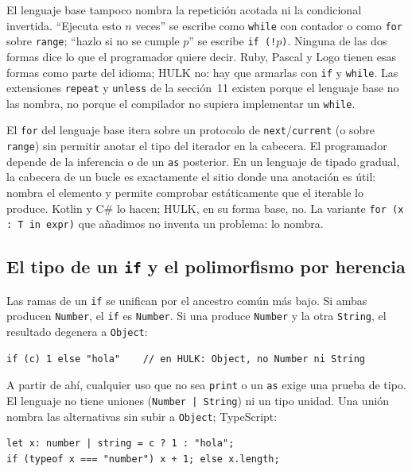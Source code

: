 \documentclass[11pt,a4paper]{article}
\begin{document}
El lenguaje base tampoco nombra la repetición acotada ni la condicional invertida. ``Ejecuta esto $n$ veces'' se escribe como \texttt{while} con contador o como \texttt{for} sobre \texttt{range}; ``hazlo si no se cumple $p$'' se escribe \texttt{if (!$p$)}. Ninguna de las dos formas dice lo que el programador quiere decir. Ruby, Pascal y Logo tienen esas formas como parte del idioma; HULK no: hay que armarlas con \texttt{if} y \texttt{while}. Las extensiones \texttt{repeat} y \texttt{unless} de la sección~11 existen porque el lenguaje base no las nombra, no porque el compilador no supiera implementar un \texttt{while}.

El \texttt{for} del lenguaje base itera sobre un protocolo de \texttt{next}/\texttt{current} (o sobre \texttt{range}) sin permitir anotar el tipo del iterador en la cabecera. El programador depende de la inferencia o de un \texttt{as} posterior. En un lenguaje de tipado gradual, la cabecera de un bucle es exactamente el sitio donde una anotación es útil: nombra el elemento y permite comprobar estáticamente que el iterable lo produce. Kotlin y C\# lo hacen; HULK, en su forma base, no. La variante \texttt{for (x : T in expr)} que añadimos no inventa un problema: lo nombra.

\subsection{El tipo de un \texttt{if} y el polimorfismo por herencia}

Las ramas de un \texttt{if} se unifican por el ancestro común más bajo. Si ambas producen \texttt{Number}, el \texttt{if} es \texttt{Number}. Si una produce \texttt{Number} y la otra \texttt{String}, el resultado degenera a \texttt{Object}:

\begin{lstlisting}[language={},numbers=none]
if (c) 1 else "hola"    // en HULK: Object, no Number ni String
\end{lstlisting}

A partir de ahí, cualquier uso que no sea \texttt{print} o un \texttt{as} exige una prueba de tipo. El lenguaje no tiene uniones (\texttt{Number | String}) ni un tipo unidad. Una unión nombra las alternativas sin subir a \texttt{Object}; TypeScript:

\begin{lstlisting}[language={},numbers=none]
let x: number | string = c ? 1 : "hola";
if (typeof x === "number") x + 1; else x.length;
\end{lstlisting}
\end{document}
